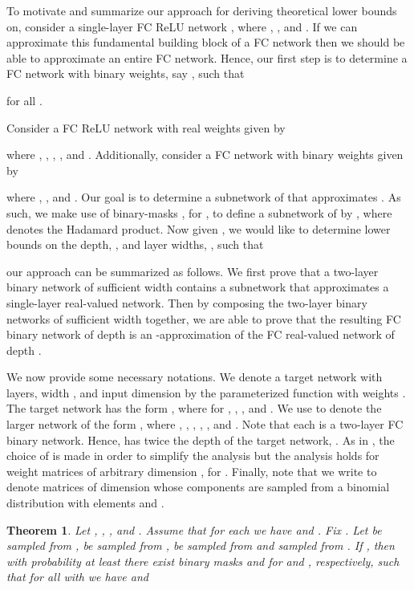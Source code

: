 \documentclass{article} \usepackage{iclr2021_conference,times}
\newtheorem{theorem}{Theorem}
\begin{document}
To motivate and summarize our approach for deriving theoretical lower bounds on, consider a single-layer FC ReLU network , where , , and . If we can approximate this fundamental building block of a FC network then we should be able to approximate an entire FC network. Hence, our first step is to determine a FC network with binary weights, say , such that

for all .

Consider a FC ReLU network with real weights given by 

where , , , , and . Additionally, consider a FC network with binary weights given by 

where , , and . Our goal is to determine a subnetwork of  that approximates . As such, we make use of binary-masks , for , to define a subnetwork of  by
, where  denotes the Hadamard product. Now given , we would like to determine lower bounds on the depth, , and layer widths, , such that

our approach can be summarized as follows.
We first prove that a two-layer binary network of sufficient width contains a subnetwork that approximates a single-layer real-valued network. Then by composing the two-layer binary networks of sufficient width together, we are able to prove that the resulting FC binary network of depth  is an -approximation of the FC real-valued network of depth . \fi



\iffalse
We now provide some necessary notations. We denote a target network with  layers, width , and input dimension  by the parameterized function  with weights . The target network has the form
, where  for , , , and . We use  to denote the larger network of the form
, where , , , , 
, and 
    .
Note that each  is a two-layer FC binary network. Hence,  has twice the depth of the target network, . As in \citep{malach2020proving}, the choice of  is made in order to simplify the analysis but the analysis holds for weight matrices  of arbitrary dimension , for . Finally, note that we write  to denote matrices of dimension  whose components are sampled from a binomial distribution with elements  and .

\begin{theorem} \label{thm:binary-weight-subnetwork}
Let , , , and . Assume that for each  we have  and . Fix . Let  be sampled from ,  be sampled from ,  be sampled from  and  sampled from . If
, then with probability at least  there exist binary masks  and  for  and , respectively, such that for all  with  we have  and 

\end{theorem}
\end{document}

